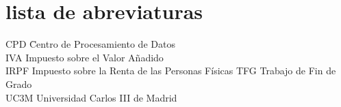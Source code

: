 \newpage %
\thispagestyle{empty}
\mbox{}

\chapter*{lista de abreviaturas}
\begin{tabbing}  %
	CPD \quad\quad\=  Centro de Procesamiento de Datos \\
	IVA \>  Impuesto sobre el Valor Añadido \\
	IRPF  \>   Impuesto sobre la Renta de las Personas Físicas
	TFG \>  Trabajo de Fin de Grado \\
	UC3M  \>  Universidad Carlos III de Madrid
\end{tabbing}